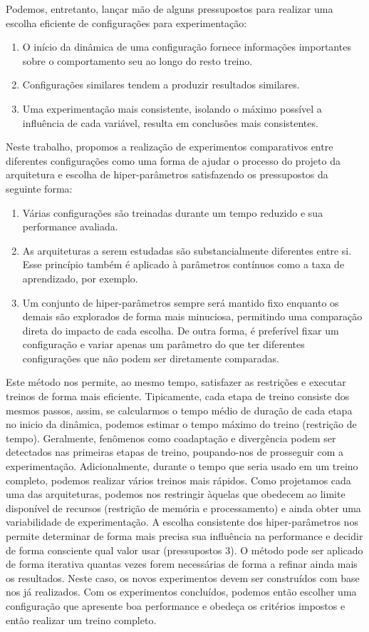 Podemos, entretanto, lançar mão de alguns pressupostos para realizar uma escolha eficiente de configurações para experimentação:
\begin{enumerate}
	\item O início da dinâmica de uma configuração fornece informações importantes sobre o comportamento seu ao longo do resto treino.
	\item Configurações similares tendem a produzir resultados similares.
	\item Uma experimentação mais consistente, isolando o máximo possível a influência de cada variável, resulta em conclusões mais consistentes.
\end{enumerate}
Neste trabalho, propomos a realização de experimentos comparativos entre diferentes configurações como uma forma de ajudar o processo do projeto da arquitetura e escolha de hiper-parâmetros satisfazendo os pressupostos da seguinte forma:
\begin{enumerate}
	\item Várias configurações são treinadas durante um tempo reduzido e sua performance avaliada.
	\item As arquiteturas a serem estudadas são substancialmente diferentes entre si. Esse princípio também é aplicado à parâmetros contínuos como a taxa de aprendizado, por exemplo.
	\item Um conjunto de hiper-parâmetros sempre será mantido fixo enquanto os demais são explorados de forma mais minuciosa, permitindo uma comparação direta do impacto de cada escolha. De outra forma, é preferível fixar um configuração e variar apenas um parâmetro do que ter diferentes configurações que não podem ser diretamente comparadas.
\end{enumerate}

Este método nos permite, ao mesmo tempo, satisfazer as restrições e executar treinos de forma mais eficiente. Tipicamente, cada etapa de treino consiste dos mesmos passos, assim, se calcularmos o tempo médio de duração de cada etapa no inicio da dinâmica, podemos estimar o tempo máximo do treino (restrição de tempo). Geralmente, fenômenos como coadaptação e divergência podem ser detectados nas primeiras etapas de treino, poupando-nos de prosseguir com a experimentação. Adicionalmente, durante o tempo que seria usado em um treino completo, podemos realizar vários treinos mais rápidos. Como projetamos cada uma das arquiteturas, podemos nos restringir àquelas que obedecem ao limite disponível de recursos (restrição de memória e processamento) e ainda obter uma variabilidade de experimentação. A escolha consistente dos hiper-parâmetros nos permite determinar de forma mais precisa sua influência na performance e decidir de forma consciente qual valor usar (pressupostos $3$). O método pode ser aplicado de forma iterativa quantas vezes forem necessárias de forma a refinar ainda mais os resultados. Neste caso, os novos experimentos devem ser construídos com base nos já realizados. Com os experimentos concluídos, podemos então escolher uma configuração que apresente boa performance e obedeça os critérios impostos e então realizar um treino completo.

